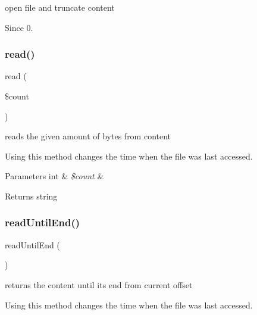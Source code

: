 open file and truncate content

\begin{DoxySince}{Since}
0. 
\end{DoxySince}
\mbox{\label{classorg_1_1bovigo_1_1vfs_1_1vfs_stream_file_aa71d90344248b49a193c5fad56cbe754}} 
\subsubsection{\texorpdfstring{read()}{read()}}
{\footnotesize\ttfamily read (\begin{DoxyParamCaption}\item[{}]{\$count }\end{DoxyParamCaption})}

reads the given amount of bytes from content

Using this method changes the time when the file was last accessed.


\begin{DoxyParams}[1]{Parameters}
int & {\em \$count} & \\
\hline
\end{DoxyParams}
\begin{DoxyReturn}{Returns}
string 
\end{DoxyReturn}
\mbox{\label{classorg_1_1bovigo_1_1vfs_1_1vfs_stream_file_a5d3b1ac4d705f2b94ac4233353efa8c1}} 
\subsubsection{\texorpdfstring{read\+Until\+End()}{readUntilEnd()}}
{\footnotesize\ttfamily read\+Until\+End (\begin{DoxyParamCaption}{ }\end{DoxyParamCaption})}

returns the content until its end from current offset

Using this method changes the time when the file was last accessed.

